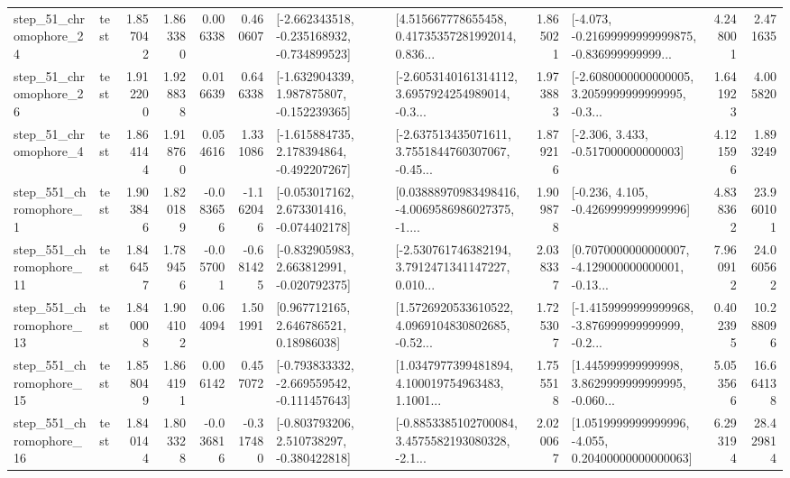 \begin{tabular}{llrrrrllrlrr}
   step\_51\_chromophore\_24 &      test &      1.857042 &    1.863380 &      0.006338 &  0.460607 &  [-2.662343518, -0.235168932, -0.734899523] &  [4.515667778655458, 0.41735357281992014, 0.836... &       1.865021 &  [-4.073, -0.21699999999999875, -0.836999999999... &            4.248001 &          2.471635 \\
   step\_51\_chromophore\_26 &      test &      1.912200 &    1.928838 &      0.016639 &  0.646338 &   [-1.632904339, 1.987875807, -0.152239365] &  [-2.6053140161314112, 3.6957924254989014, -0.3... &       1.973883 &  [-2.6080000000000005, 3.2059999999999995, -0.3... &            1.641923 &          4.005820 \\
    step\_51\_chromophore\_4 &      test &      1.864144 &    1.918760 &      0.054616 &  1.331086 &   [-1.615884735, 2.178394864, -0.492207267] &  [-2.637513435071611, 3.7551844760307067, -0.45... &       1.879216 &                [-2.306, 3.433, -0.517000000000003] &            4.121596 &          1.893249 \\
   step\_551\_chromophore\_1 &      test &      1.903846 &    1.820189 &     -0.083656 & -1.162046 &   [-0.053017162, 2.673301416, -0.074402178] &  [0.03888970983498416, -4.0069586986027375, -1.... &       1.909878 &               [-0.236, 4.105, -0.4269999999999996] &            4.838362 &         23.960101 \\
  step\_551\_chromophore\_11 &      test &      1.846457 &    1.789456 &     -0.057001 & -0.681425 &   [-0.832905983, 2.663812991, -0.020792375] &  [-2.530761746382194, 3.7912471341147227, 0.010... &       2.038337 &  [0.7070000000000007, -4.129000000000001, -0.13... &            7.960912 &         24.060562 \\
  step\_551\_chromophore\_13 &      test &      1.840008 &    1.904102 &      0.064094 &  1.501991 &      [0.967712165, 2.646786521, 0.18986038] &  [1.5726920533610522, 4.0969104830802685, -0.52... &       1.725307 &  [-1.4159999999999968, -3.876999999999999, -0.2... &            0.402395 &         10.288096 \\
  step\_551\_chromophore\_15 &      test &      1.858049 &    1.864191 &      0.006142 &  0.457072 &  [-0.793833332, -2.669559542, -0.111457643] &  [1.0347977399481894, 4.100019754963483, 1.1001... &       1.755518 &  [1.445999999999998, 3.8629999999999995, -0.060... &            5.053566 &         16.664138 \\
  step\_551\_chromophore\_16 &      test &      1.840144 &    1.803328 &     -0.036816 & -0.317480 &   [-0.803793206, 2.510738297, -0.380422818] &  [-0.8853385102700084, 3.4575582193080328, -2.1... &       2.020067 &  [1.0519999999999996, -4.055, 0.20400000000000063] &            6.293194 &         28.429814 \\

\end{tabular}
